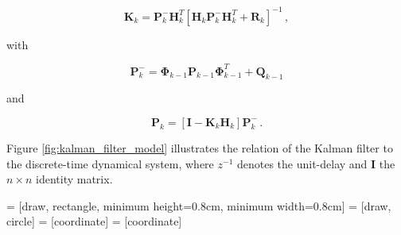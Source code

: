\begin{equation}\label{eq:Kalman_gain}
  \mathbf{K}_{k} = \mathbf{P}^-_k \mathbf{H}^T_k[\mathbf{H}_k \mathbf{P}^-_k \mathbf{H}^T_k + \mathbf{R}_k]^{-1}\,,
\end{equation}

\noindent
with

\begin{equation}\label{eq:apriori_error_cov}
  \mathbf{P}^-_{k} = \bm{\Phi}_{k-1} \mathbf{P}_{k-1} \bm{\Phi}^T_{k-1} + \mathbf{Q}_{k-1}
\end{equation}

\noindent
and

\begin{equation}\label{eq:aposteriori_error_cov}
  \mathbf{P}_{k} = [\mathbf{I} - \mathbf{K}_{k}\mathbf{H}_{k}]\mathbf{P}^-_{k}\,.
\end{equation}

\noindent
Figure \ref{fig:kalman_filter_model} illustrates the relation of the Kalman filter to the discrete-time dynamical system, where $z^{-1}$ denotes the unit-delay and $\mathbf{I}$ the $n\times n$ identity matrix. 

 = [draw, rectangle, minimum height=0.8cm, minimum width=0.8cm]
 = [draw, circle]
 = [coordinate]
 = [coordinate]

